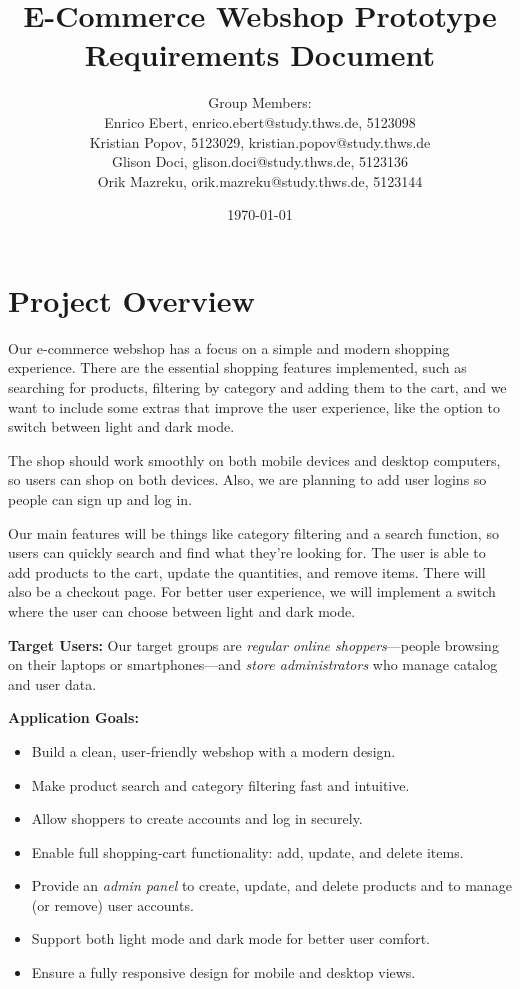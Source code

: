 \documentclass[a4paper,12pt]{article}
\title{E-Commerce Webshop Prototype \\
	Requirements Document}
\author{
	Group Members: \\
	Enrico Ebert, enrico.ebert@study.thws.de, 5123098 \\
	Kristian Popov, 5123029, kristian.popov@study.thws.de \\
	Glison Doci, glison.doci@study.thws.de, 5123136 \\
	Orik Mazreku, orik.mazreku@study.thws.de, 5123144
}
\date{\today}
\begin{document}
	
	\maketitle
	
\section{Project Overview}

Our e-commerce webshop has a focus on a simple and modern shopping experience. There are the essential shopping features implemented, such as searching for products, filtering by category and adding them to the cart, and we want to include some extras that improve the user experience, like the option to switch between light and dark mode.

The shop should work smoothly on both mobile devices and desktop computers, so users can shop on both devices. Also, we are planning to add user logins so people can sign up and log in.

Our main features will be things like category filtering and a search function, so users can quickly search and find what they’re looking for. The user is able to add products to the cart, update the quantities, and remove items. There will also be a checkout page. For better user experience, we will implement a switch where the user can choose between light and dark mode.

\textbf{Target Users:}
Our target groups are \emph{regular online shoppers}—people browsing on their laptops or smartphones—and \emph{store administrators} who manage catalog and user data.

\textbf{Application Goals:}
\begin{itemize}
	\item Build a clean, user‑friendly webshop with a modern design.
	\item Make product search and category filtering fast and intuitive.
	\item Allow shoppers to create accounts and log in securely.
	\item Enable full shopping‑cart functionality: add, update, and delete items.
	\item Provide an \emph{admin panel} to create, update, and delete products and to manage (or remove) user accounts.
	\item Support both light mode and dark mode for better user comfort.
	\item Ensure a fully responsive design for mobile and desktop views.

\end{itemize}
	
\end{document}
